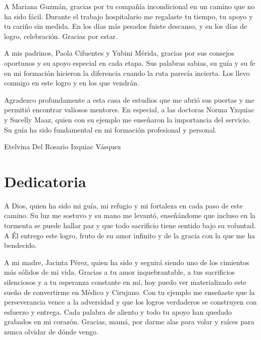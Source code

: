 \documentclass[11pt,letterpaper]{report}
\begin{document}
A Mariana Guzmán, gracias por tu compañía incondicional en un camino 
que no ha sido fácil. Durante el trabajo hospitalario me regalaste tu tiempo, 
tu apoyo y tu cariño sin medida. En los días más pesados fuiste descanso, y 
en los días de logro, celebración. Gracias por estar.

A mis padrinos, Paola Cifuentes y Yubini Mérida, gracias por sus consejos 
oportunos y su apoyo especial en cada etapa. Sus palabras sabias, su guía y 
su fe en mi formación hicieron la diferencia cuando la ruta parecía incierta. 
Los llevo conmigo en este logro y en los que vendrán.

Agradezco profundamente a esta casa de estudios que me abrió sus puertas y me 
permitió encontrar valiosos mentores. En especial, a las doctoras Norma Yxquiac
y Sucelly Maaz, quien con su ejemplo me enseñaron la importancia del servicio.
Su guía ha sido fundamental en mi formación profesional y personal.




\begin{flushright}
Etelvina Del Rosario Ixquiac Vásquez
\end{flushright}

\chapter*{Dedicatoria}
A Dios, quien ha sido mi guía, mi refugio y mi fortaleza en cada paso de este 
camino. Su luz me sostuvo y su mano me levantó, enseñándome que incluso en la 
tormenta se puede hallar paz y que todo sacrificio tiene sentido bajo su 
voluntad. A Él entrego este logro, fruto de su amor infinito y de la gracia 
con la que me ha bendecido.

A mi madre, Jacinta Pérez, quien ha sido y seguirá siendo uno de los cimientos 
más sólidos de mi vida. Gracias a tu amor inquebrantable, a tus sacrificios 
silenciosos y a tu esperanza constante en mí, hoy puedo ver materializado este 
sueño de convertirme en Médico y Cirujano. Con tu ejemplo me enseñaste que la 
perseverancia vence a la adversidad y que los logros verdaderos se construyen 
con esfuerzo y entrega. Cada palabra de aliento y todo tu apoyo han quedado 
grabados en mi corazón. Gracias, mamá, por darme alas para volar y raíces 
para nunca olvidar de dónde vengo.
\end{document}
